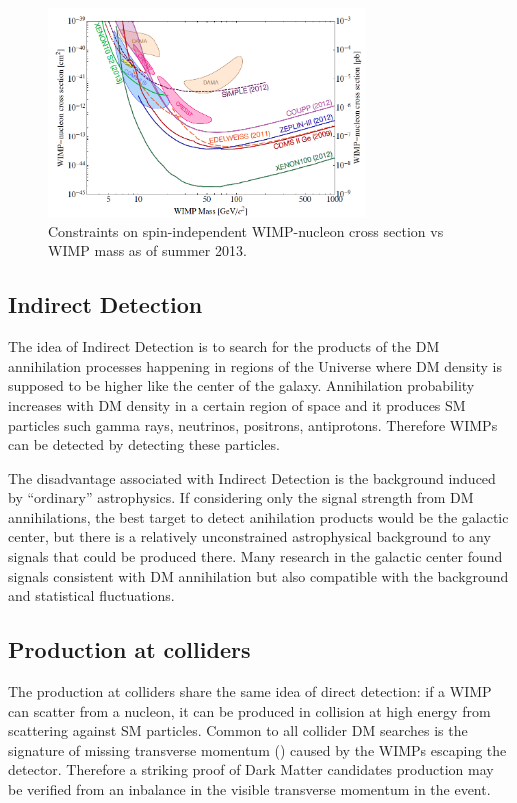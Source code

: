 \begin{figure}[p]
\centering
\includegraphics[width=0.75\textwidth]{DarkMatter/WIMPcs}
\caption{Constraints on spin-independent WIMP-nucleon cross section vs WIMP mass as of summer 2013.}
\label{fig:WIMPcs}
\end{figure}

\subsection{Indirect Detection}
The idea of Indirect Detection is to search for the products of the DM annihilation processes  happening in regions of the Universe where DM density is supposed to be higher like the center of the galaxy. Annihilation probability increases with DM density in a certain region of space and it produces SM particles such gamma rays, neutrinos, positrons, antiprotons. Therefore WIMPs can be detected by detecting these particles.

The disadvantage associated with Indirect Detection is the background induced by ``ordinary'' astrophysics. If considering only the signal strength from DM annihilations, the best target to detect anihilation products would be the galactic center, but there is a relatively unconstrained astrophysical background to any signals that could be produced there. Many research in the galactic center found signals consistent with DM annihilation but also compatible with the background and statistical fluctuations.

\subsection{Production at colliders}
The production at colliders share the same idea of direct detection: if a WIMP can scatter from a nucleon, it can be produced in \pp collision at high energy from scattering against SM particles. Common to all collider DM searches is the signature of missing transverse momentum (\met) caused by the WIMPs escaping the detector. Therefore a striking proof of Dark Matter candidates production may be verified from an inbalance in the visible transverse momentum in the event.

